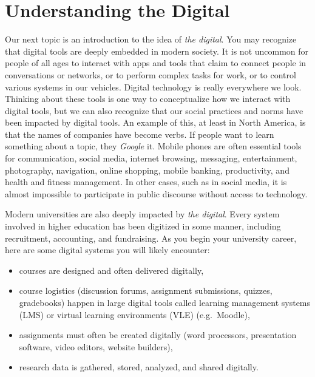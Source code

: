 \documentclass[
]{book}
\providecommand{\tightlist}{%
  \setlength{\itemsep}{0pt}\setlength{\parskip}{0pt}}
\theoremstyle{definition}
\theoremstyle{definition}
\theoremstyle{definition}
\theoremstyle{definition}
\theoremstyle{remark}
\begin{document}
\hypertarget{understanding-the-digital}{%
\section{Understanding the Digital}\label{understanding-the-digital}}

Our next topic is an introduction to the idea of \emph{the digital}. You may recognize that digital tools are deeply embedded in modern society. It is not uncommon for people of all ages to interact with apps and tools that claim to connect people in conversations or networks, or to perform complex tasks for work, or to control various systems in our vehicles. Digital technology is really everywhere we look. Thinking about these tools is one way to conceptualize how we interact with digital tools, but we can also recognize that our social practices and norms have been impacted by digital tools. An example of this, at least in North America, is that the names of companies have become verbs. If people want to learn something about a topic, they \emph{Google} it. Mobile phones are often essential tools for communication, social media, internet browsing, messaging, entertainment, photography, navigation, online shopping, mobile banking, productivity, and health and fitness management. In other cases, such as in social media, it is almost impossible to participate in public discourse without access to technology.

Modern universities are also deeply impacted by \emph{the digital}. Every system involved in higher education has been digitized in some manner, including recruitment, accounting, and fundraising. As you begin your university career, here are some digital systems you will likely encounter:

\begin{itemize}
\tightlist
\item
  courses are designed and often delivered digitally,
\item
  course logistics (discussion forums, assignment submissions, quizzes, gradebooks) happen in large digital tools called learning management systems (LMS) or virtual learning environments (VLE) (e.g.~Moodle),
\item
  assignments must often be created digitally (word processors, presentation software, video editors, website builders),
\item
  research data is gathered, stored, analyzed, and shared digitally.
\end{itemize}
\end{document}
